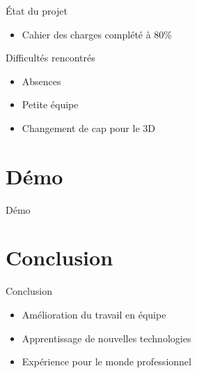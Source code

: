 \documentclass[11pt]{beamer}
\begin{document}
    \begin{frame}{État du projet}
        \begin{itemize}
            \item Cahier des charges complété à 80\%
        \end{itemize}
    \end{frame}

    \begin{frame}{Difficultés rencontrés}
        \begin{itemize}

            \item Absences
            \item Petite équipe
            \item Changement de cap pour le 3D
        \end{itemize}
    \end{frame}

    \section{Démo}
    \begin{frame}{Démo}

    \end{frame}

    \section{Conclusion}
    \begin{frame}{Conclusion}
        \begin{itemize}
            \item Amélioration du travail en équipe
            \item Apprentissage de nouvelles technologies
            \item Expérience pour le monde professionnel
        \end{itemize}
    \end{frame}
\end{document}

